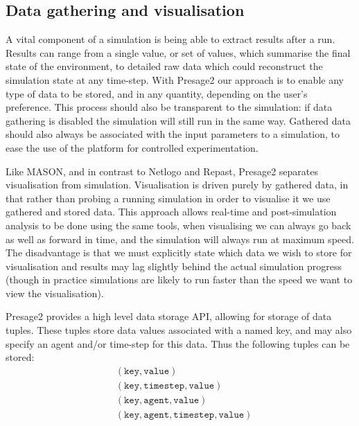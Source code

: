 \subsection{Data gathering and visualisation}

A vital component of a simulation is being able to extract results after a run.
Results can range from a single value, or set of values, which summarise the final
state of the environment, to detailed raw data which could reconstruct the
simulation state at any time-step. With Presage2 our approach is to enable any
type of data to be stored, and in any quantity, depending on the user's
preference. This process should also be transparent to the simulation: if data
gathering is disabled the simulation will still run in the same way. Gathered
data should also always be associated with the input parameters to a simulation,
to ease the use of the platform for controlled experimentation.

Like MASON, and in contrast to Netlogo and Repast, Presage2 separates
visualisation from simulation. Visualisation is driven purely by gathered data,
in that rather than probing a running simulation in order to visualise it we use
gathered and stored data. This approach allows real-time and post-simulation
analysis to be done using the same tools, when visualising we can always go back
as well as forward in time, and the simulation will always run at maximum speed.
The disadvantage is that we must explicitly state which data we wish to store
for visualisation and results may lag slightly behind the actual simulation
progress (though in practice simulations are likely to run faster than the speed
we want to view the visualisation).

Presage2 provides a high level data storage \ac{API}, allowing for storage of
data tuples. These tuples store data values associated with a named key, and may
also specify an agent and/or time-step for this data. Thus the following tuples
can be stored:
\begin{align*}
&(\mathtt{key},\mathtt{value})\\
&(\mathtt{key},\mathtt{timestep},\mathtt{value})\\
&(\mathtt{key},\mathtt{agent},\mathtt{value})\\
&(\mathtt{key},\mathtt{agent},\mathtt{timestep},\mathtt{value})
\end{align*}

